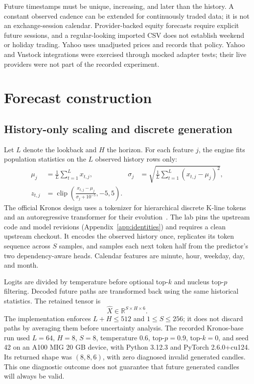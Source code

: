 \documentclass[11pt,a4paper]{article}
\begin{document}
Future timestamps must be unique, increasing, and later than the history. A
constant observed cadence can be extended for continuously traded data; it is
not an exchange-session calendar. Provider-backed equity forecasts require
explicit future sessions, and a regular-looking imported CSV does not establish
weekend or holiday trading. Yahoo uses unadjusted prices and records that policy.
Yahoo and Vnstock integrations were exercised through mocked adapter tests;
their live providers were not part of the recorded experiment.

\section{Forecast construction}
\subsection{History-only scaling and discrete generation}
Let $L$ denote the lookback and $H$ the horizon. For each feature $j$, the engine
fits population statistics on the $L$ observed history rows only:
\begin{align}
\mu_j&=\frac{1}{L}\sum_{t=1}^{L}x_{t,j}, &
\sigma_j&=\sqrt{\frac{1}{L}\sum_{t=1}^{L}(x_{t,j}-\mu_j)^2},\\
z_{t,j}&=\operatorname{clip}\!\left(\frac{x_{t,j}-\mu_j}{\sigma_j+10^{-5}},-5,5\right).
\end{align}
The official Kronos design uses a tokenizer for hierarchical discrete K-line
tokens and an autoregressive transformer for their evolution~\cite{kronos}.
The lab pins the upstream code and model revisions (Appendix~\ref{app:identities})
and requires a clean upstream checkout. It encodes the observed history once,
replicates its token sequence across $S$ samples, and samples each next token
half from the predictor's two dependency-aware heads. Calendar features are
minute, hour, weekday, day, and month.

Logits are divided by temperature before optional top-$k$ and nucleus top-$p$
filtering. Decoded future paths are transformed back using the same historical
statistics. The retained tensor is
\[
  \widehat X\in\mathbb R^{S\times H\times6}.
\]
The implementation enforces $L+H\leq512$ and $1\leq S\leq256$; it does not
discard paths by averaging them before uncertainty analysis. The recorded
Kronos-base run used $L=64$, $H=8$, $S=8$, temperature $0.6$, top-$p=0.9$,
top-$k=0$, and seed 42 on an A100 MIG 20 GB device, with Python 3.12.3 and
PyTorch 2.6.0+cu124. Its returned shape was $(8,8,6)$, with zero diagnosed invalid
generated candles. This one diagnostic outcome does not guarantee that future
generated candles will always be valid.
\end{document}
